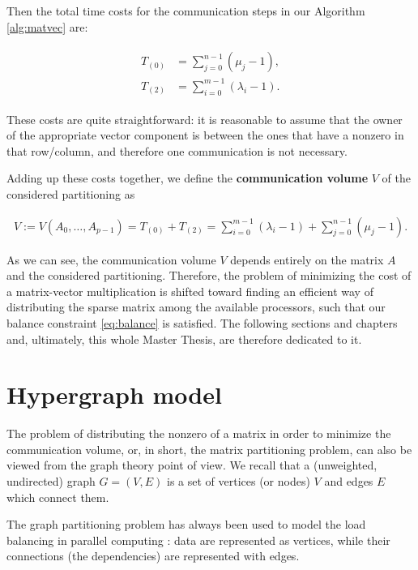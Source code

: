 Then the total time costs for the communication steps in our Algorithm \ref{alg:matvec} are:

\begin{align}
	\begin{aligned}
	T_{(0)} &= \sum_{j=0}^{n-1} (\mu_j -1), \\
	T_{(2)} &= \sum_{i=0}^{m-1} (\lambda_i -1).
\end{aligned} \label{eq:T_comm}
\end{align}

These costs are quite straightforward: it is reasonable to assume that the owner of the appropriate vector component is between the ones that have a nonzero in that row/column, and therefore one communication is not necessary.

Adding up these costs together, we define the \textbf{communication volume} $V$ of the considered partitioning as

\begin{align}
	V := V(A_0,\dots,A_{p-1}) = T_{(0)} + T_{(2)} = \sum_{i=0}^{m-1} (\lambda_i -1) + \sum_{j=0}^{n-1} (\mu_j-1).
	\label{eq:volume}
\end{align}

As we can see, the communication volume $V$ depends entirely on the matrix $A$ and the considered partitioning. Therefore, the problem of minimizing the cost of a matrix-vector multiplication is shifted toward finding an efficient way of distributing the sparse matrix among the available processors, such that our balance constraint \eqref{eq:balance} is satisfied. The following sections and chapters and, ultimately, this whole Master Thesis, are therefore dedicated to it.

\section{Hypergraph model}

The problem of distributing the nonzero of a matrix in order to minimize the communication volume, or, in short, the matrix partitioning problem, can also be viewed from the graph theory point of view. We recall that a (unweighted, undirected) graph $G=(V,E)$ is a set of vertices (or nodes) $V$ and edges $E$ which connect them. 

The graph partitioning problem has always been used to model the load balancing in parallel computing \cite{parallel_hypergraph}: data are represented as vertices, while their connections (the dependencies) are represented with edges. 

